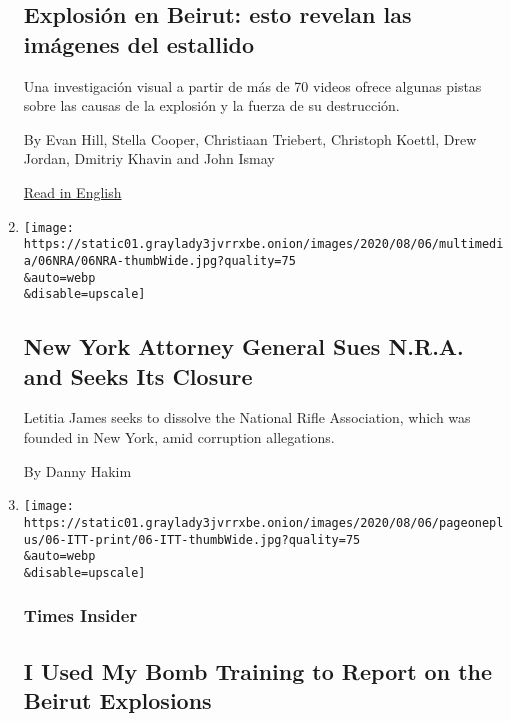 \begin{enumerate}
  \hypertarget{explosiuxf3n-en-beirut-esto-revelan-las-imuxe1genes-del-estallido}{%
  \subsection{Explosión en Beirut: esto revelan las imágenes del
  estallido}\label{explosiuxf3n-en-beirut-esto-revelan-las-imuxe1genes-del-estallido}}

  Una investigación visual a partir de más de 70 videos ofrece algunas
  pistas sobre las causas de la explosión y la fuerza de su destrucción.

  By Evan Hill, Stella Cooper, Christiaan Triebert, Christoph Koettl,
  Drew Jordan, Dmitriy Khavin and John Ismay

  \href{https://www.nytimes3xbfgragh.onion/2020/08/05/world/middleeast/beirut-explosion-footage.html}{Read
  in English}
\item
  \href{/2020/08/06/us/ny-nra-lawsuit-letitia-james.html}{}

  \texttt{[image: https://static01.graylady3jvrrxbe.onion/images/2020/08/06/multimedia/06NRA/06NRA-thumbWide.jpg?quality=75\\\&auto=webp\\\&disable=upscale]}

  \hypertarget{new-york-attorney-general-sues-nra-and-seeks-its-closure}{%
  \subsection{New York Attorney General Sues N.R.A. and Seeks Its
  Closure}\label{new-york-attorney-general-sues-nra-and-seeks-its-closure}}

  Letitia James seeks to dissolve the National Rifle Association, which
  was founded in New York, amid corruption allegations.

  By Danny Hakim
\item
  \href{/2020/08/06/insider/bomb-training-beirut-explosions.html}{}

  \texttt{[image: https://static01.graylady3jvrrxbe.onion/images/2020/08/06/pageoneplus/06-ITT-print/06-ITT-thumbWide.jpg?quality=75\\\&auto=webp\\\&disable=upscale]}

  \hypertarget{times-insider}{%
  \subsubsection{Times Insider}\label{times-insider}}

  \hypertarget{i-used-my-bomb-training-to-report-on-the-beirut-explosions}{%
  \subsection{I Used My Bomb Training to Report on the Beirut
  Explosions}\label{i-used-my-bomb-training-to-report-on-the-beirut-explosions}}


\end{enumerate}
